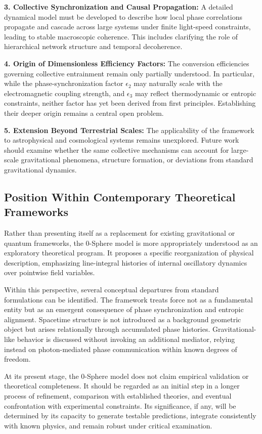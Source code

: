 \documentclass[12pt,letterpaper]{article}
\begin{document}
\textbf{3. Collective Synchronization and Causal Propagation:} A detailed dynamical model must be developed to describe how local phase correlations propagate and cascade across large systems under finite light-speed constraints, leading to stable macroscopic coherence. This includes clarifying the role of hierarchical network structure and temporal decoherence.

\textbf{4. Origin of Dimensionless Efficiency Factors:} The conversion efficiencies governing collective entrainment remain only partially understood. In particular, while the phase-synchronization factor $\epsilon_2$ may naturally scale with the electromagnetic coupling strength, and $\epsilon_3$ may reflect thermodynamic or entropic constraints, neither factor has yet been derived from first principles. Establishing their deeper origin remains a central open problem.

\textbf{5. Extension Beyond Terrestrial Scales:} The applicability of the framework to astrophysical and cosmological systems remains unexplored. Future work should examine whether the same collective mechanisms can account for large-scale gravitational phenomena, structure formation, or deviations from standard gravitational dynamics.


\subsection{Position Within Contemporary Theoretical Frameworks}
\label{subsec:position}

Rather than presenting itself as a replacement for existing gravitational or quantum frameworks, the 0-Sphere model is more appropriately understood as an exploratory theoretical program. It proposes a specific reorganization of physical description, emphasizing line-integral histories of internal oscillatory dynamics over pointwise field variables.

Within this perspective, several conceptual departures from standard formulations can be identified. The framework treats force not as a fundamental entity but as an emergent consequence of phase synchronization and entropic alignment. Spacetime structure is not introduced as a background geometric object but arises relationally through accumulated phase histories. Gravitational-like behavior is discussed without invoking an additional mediator, relying instead on photon-mediated phase communication within known degrees of freedom.

At its present stage, the 0-Sphere model does not claim empirical validation or theoretical completeness. It should be regarded as an initial step in a longer process of refinement, comparison with established theories, and eventual confrontation with experimental constraints. Its significance, if any, will be determined by its capacity to generate testable predictions, integrate consistently with known physics, and remain robust under critical examination.
\end{document}
